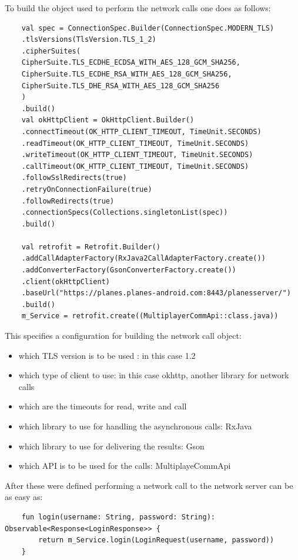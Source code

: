 To build the object used to perform the network calls one does as follows:

\begin{lstlisting}
	val spec = ConnectionSpec.Builder(ConnectionSpec.MODERN_TLS)
	.tlsVersions(TlsVersion.TLS_1_2)
	.cipherSuites(
	CipherSuite.TLS_ECDHE_ECDSA_WITH_AES_128_GCM_SHA256,
	CipherSuite.TLS_ECDHE_RSA_WITH_AES_128_GCM_SHA256,
	CipherSuite.TLS_DHE_RSA_WITH_AES_128_GCM_SHA256
	)
	.build()
	val okHttpClient = OkHttpClient.Builder()
	.connectTimeout(OK_HTTP_CLIENT_TIMEOUT, TimeUnit.SECONDS)
	.readTimeout(OK_HTTP_CLIENT_TIMEOUT, TimeUnit.SECONDS)
	.writeTimeout(OK_HTTP_CLIENT_TIMEOUT, TimeUnit.SECONDS)
	.callTimeout(OK_HTTP_CLIENT_TIMEOUT, TimeUnit.SECONDS)
	.followSslRedirects(true)
	.retryOnConnectionFailure(true)
	.followRedirects(true)
	.connectionSpecs(Collections.singletonList(spec))
	.build()
	
	val retrofit = Retrofit.Builder()
	.addCallAdapterFactory(RxJava2CallAdapterFactory.create())
	.addConverterFactory(GsonConverterFactory.create())
	.client(okHttpClient)
	.baseUrl("https://planes.planes-android.com:8443/planesserver/")
	.build()
	m_Service = retrofit.create((MultiplayerCommApi::class.java))
\end{lstlisting}
	
	This specifies a configuration for building the network call object:

\begin{itemize}
	\item which TLS version is to be used : in this case 1.2
	\item which type of client to use: in this case okhttp, another library for network calls
	\item which are the timeouts for read, write and call
	\item which library to use for handling the asynchronous calls: RxJava
	\item which library to use for delivering the results: Gson
	\item which API is to be used for the calls: MultiplayeCommApi
\end{itemize}	

After these were defined performing a network call to the network server can be as easy as:

\begin{lstlisting}
	fun login(username: String, password: String): Observable<Response<LoginResponse>> {
		return m_Service.login(LoginRequest(username, password))
	}
\end{lstlisting}

